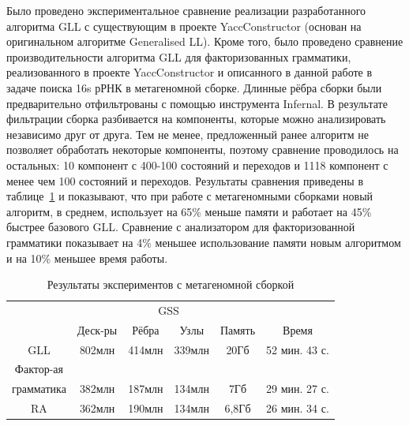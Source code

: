 \documentclass[12pt]{matmex-diploma-custom}
\begin{document}
    Было проведено экспериментальное сравнение реализации разработанного алгоритма GLL с
    существующим в проекте YaccConstructor (основан на оригинальном алгоритме Generalised LL). 
    Кроме того, было проведено сравнение производительности алгоритма GLL для факторизованных грамматики, реализованного в 
    проекте YaccConstructor и описанного в данной 
    работе в задаче поиска 16s рРНК в метагеномной сборке. Длинные рёбра сборки были предварительно отфильтрованы с помощью
    инструмента Infernal. В результате фильтрации сборка разбивается на компоненты, которые можно анализировать независимо друг от
    друга. Тем не менее, предложенный ранее алгоритм не позволяет обработать некоторые компоненты, поэтому сравнение проводилось
    на остальных: 10 компонент с 400-100 состояний и переходов и 1118 компонент с менее чем 100 состояний и переходов.
    Результаты сравнения приведены в таблице~\ref{expTable1} и показывают, что при работе с метагеномными сборками новый
    алгоритм, в среднем, использует на 65\% меньше памяти и работает на 45\% быстрее базового GLL. Сравнение с анализатором 
    для факторизованной грамматики показывает на 4\% меньшее использование памяти новым алгоритмом и на 10\% меньшее время работы.
    
    \begin{table}
        \begin{center}
        \begin{tabular}{ | c | c | c | c | c | c |}
            \hline
            & &\multicolumn{2}{c|}{GSS} & & \\
            \cline{3-4}
                              & Деск-ры & Рёбра   & Узлы   & Память& Время   \\ \hline
            GLL               &  802млн &  414млн & 339млн  & 20Гб & 52 мин. 43 с.  \\ \hline
            Фактор-ая &&&&&\\
            грамматика        &  382млн &  187млн & 134млн & 7Гб & 29 мин. 27 с.  \\ \hline
            RA                &  362млн &  190млн & 134млн & 6,8Гб & 26 мин. 34 с.  \\ \hline %
        \end{tabular}
        \caption{Результаты экспериментов с метагеномной сборкой}
        \label{expTable1}
        \end{center}
    \end{table}
	
\end{document}
